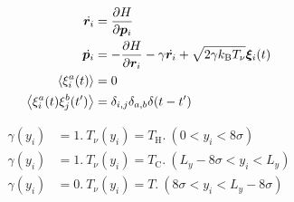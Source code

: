 \documentclass[dvipdfmx]{jsarticle}
\numberwithin{equation}{subsection}
\begin{document}
\begin{align}
  \dot{\bm{r}_i} &= \pdv{H}{\bm{p}_i} \\
  \dot{\bm{p}_i} &= - \pdv{H}{\bm{r}_i} - \gamma \dot{\bm{r}_i} + \sqrt{2 \gamma k_{\text{B}}T_{\nu}}\bm{\xi}_i (t) \\
  \expval{\xi_{i}^{a}(t)} &= 0 \\
  \expval{\xi_{i}^{a}(t)\xi_{j}^{b}(t')} &= \delta_{i,j} \delta_{a,b}\delta (t-t') \\
\end{align}

\begin{align}
  \gamma(y_i) &= 1. \ T_{\nu}(y_i) = T_{\text{H}}. \ (0 < y_i < 8\sigma) \\
  \gamma(y_i) &= 1. \ T_{\nu}(y_i) = T_{\text{C}}. \ (L_y - 8\sigma < y_i < L_y) \\
  \gamma(y_i) &= 0. \ T_{\nu}(y_i) = T. \ (8\sigma < y_i < L_y - 8\sigma)
\end{align}












\end{document}
